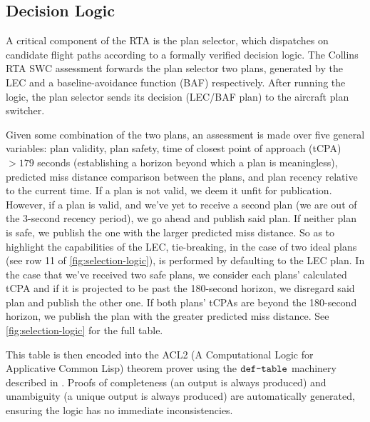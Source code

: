\subsection{Decision Logic}




A critical component of the RTA is the plan selector, which dispatches on candidate flight paths according to a formally verified decision logic. The Collins RTA SWC assessment forwards the plan selector two plans, generated by the LEC and a baseline-avoidance function (BAF) respectively. After running the logic, the plan selector sends its decision (LEC/BAF plan) to the aircraft plan switcher.


Given some combination of the two plans, an assessment is made over five general variables: plan validity, plan safety, time of closest point of approach (tCPA) $> 179$ seconds (establishing a horizon beyond which a plan is meaningless), predicted miss distance comparison between the plans, and plan recency relative to the current time. If a plan is not valid, we deem it unfit for publication. However, if a plan is valid, and we've yet to receive a second plan (we are out of the 3-second recency period), we go ahead and publish said plan. If neither plan is safe, we publish the one with the larger predicted miss distance. So as to highlight the capabilities of the LEC, tie-breaking, in the case of two ideal plans (see row 11 of \ref{fig:selection-logic}), is performed by defaulting to the LEC plan. In the case that we've received two safe plans, we consider each plans' calculated tCPA and if it is projected to be past the 180-second horizon, we disregard said plan and publish the other one. If both plans' tCPAs are beyond the 180-second horizon, we publish the plan with the greater predicted miss distance. See \ref{fig:selection-logic} for the full table.

This table is then encoded into the ACL2 (A Computational Logic for Applicative Common Lisp) theorem prover \cite{acl2} using the $\verb+def-table+$ machinery described in \cite{dasc2020}. Proofs of completeness (an output is always produced) and unambiguity (a unique output is always produced) are automatically generated, ensuring the logic has no immediate inconsistencies.

